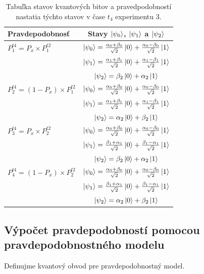 \begin{table}
\centering
\begin{tabular}{|l|c|}
\hline
\textbf{Pravdepodobnosť} & \textbf{Stavy \(\ket{\psi_0}\), \(\ket{\psi_1}\) a \(\ket{\psi_2}\)} \\
\hline
\(P^{t4}_1 = P_x \times P^{t2}_1\) & 
\(\ket{\psi_0} = \frac{\alpha_0 + \beta_0}{\sqrt{2}}\ket{0} + \frac{\alpha_0 - \beta_0}{\sqrt{2}}\ket{1}\) \\
& \(\ket{\psi_1} = \frac{\alpha_1 + \beta_1}{\sqrt{2}}\ket{0} + \frac{\alpha_1 - \beta_1}{\sqrt{2}}\ket{1}\) \\
& \(\ket{\psi_2} = \beta_2\ket{0} + \alpha_2\ket{1}\) \\
\hline

\(P^{t4}_2 = (1-P_x) \times P^{t2}_1\) & 
\(\ket{\psi_0} = \frac{\alpha_0 + \beta_0}{\sqrt{2}}\ket{0} + \frac{\alpha_0 - \beta_0}{\sqrt{2}}\ket{1}\) \\
& \(\ket{\psi_1} = \frac{\alpha_1 + \beta_1}{\sqrt{2}}\ket{0} + \frac{\alpha_1 - \beta_1}{\sqrt{2}}\ket{1}\) \\
& \(\ket{\psi_2} = \alpha_2\ket{0} + \beta_2\ket{1}\) \\
\hline

\(P^{t4}_3 = P_x \times P^{t2}_2\) & 
\(\ket{\psi_0} = \frac{\alpha_0 + \beta_0}{\sqrt{2}}\ket{0} + \frac{\alpha_0 - \beta_0}{\sqrt{2}}\ket{1}\) \\
& \(\ket{\psi_1} = \frac{\beta_1 + \alpha_1}{\sqrt{2}}\ket{0} + \frac{\beta_1 - \alpha_1}{\sqrt{2}}\ket{1}\) \\
& \(\ket{\psi_2} = \beta_2\ket{0} + \alpha_2\ket{1}\) \\
\hline

\(P^{t4}_4 = (1-P_x) \times P^{t2}_2\) & 
\(\ket{\psi_0} = \frac{\alpha_0 + \beta_0}{\sqrt{2}}\ket{0} + \frac{\alpha_0 - \beta_0}{\sqrt{2}}\ket{1}\) \\
& \(\ket{\psi_1} = \frac{\beta_1 + \alpha_1}{\sqrt{2}}\ket{0} + \frac{\beta_1 - \alpha_1}{\sqrt{2}}\ket{1}\) \\
& \(\ket{\psi_2} = \alpha_2\ket{0} + \beta_2\ket{1}\) \\
\hline
\end{tabular}

\caption{\label{expr3_t4_states} Tabuľka stavov kvantových bitov a pravedpodobností
nastatia týchto stavov v čase \(t_4\) experimentu 3.}
\end{table}

\subsection*{Výpočet pravdepodobností pomocou pravdepodobnostného modelu}
Definujme kvantový obvod pre pravdepodobnostný model.

